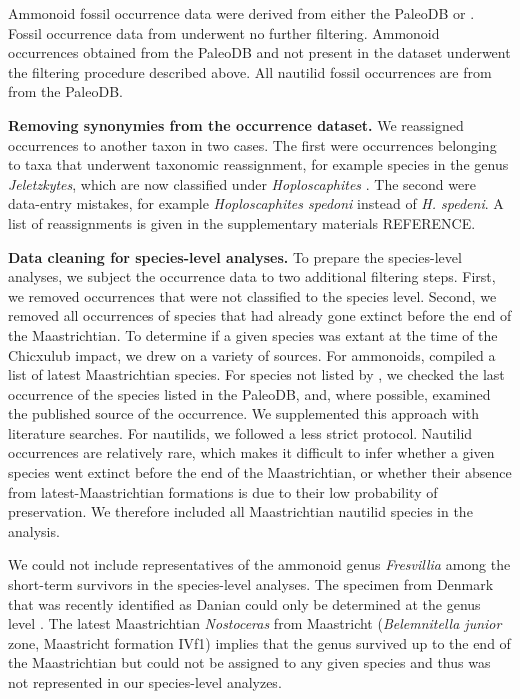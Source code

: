 \documentclass[a4paper]{article}
\begin{document}
Ammonoid fossil occurrence data were derived from either the PaleoDB or \textcite{flannery-sutherlandLateCretaceousAmmonoids2024}. Fossil occurrence data from \textcite{flannery-sutherlandLateCretaceousAmmonoids2024} underwent no further filtering. Ammonoid occurrences obtained from the PaleoDB and not present in the \textcite{flannery-sutherlandLateCretaceousAmmonoids2024} dataset underwent the filtering procedure described above. All nautilid fossil occurrences are from from the PaleoDB. 

\textbf{Removing synonymies from the occurrence dataset.} We reassigned occurrences to another taxon in two cases. The first were occurrences belonging to taxa that underwent taxonomic reassignment, for example species in the genus \textit{Jeletzkytes}, which are now classified under \textit{Hoploscaphites} \parencite{landmanScaphitesNodosusGroup2010}. The second were data-entry mistakes, for example \textit{Hoploscaphites spedoni} instead of \textit{H. spedeni}. A list of reassignments is given in the supplementary materials REFERENCE. 

\textbf{Data cleaning for species-level analyses.} To prepare the species-level analyses, we subject the occurrence data to two additional filtering steps. First, we removed occurrences that were not classified to the species level. Second, we removed all occurrences of species that had already gone extinct before the end of the Maastrichtian. To determine if a given species was extant at the time of the Chicxulub impact, we drew on a variety of sources. 
For ammonoids, \textcite{landmanAmmonitesBrinkExtinction2015} compiled a list of latest Maastrichtian species.
For species not listed by \textcite{landmanAmmonitesBrinkExtinction2015}, we checked the last occurrence of the species listed in the PaleoDB, and, where possible, examined the published source of the occurrence. We supplemented this approach with literature searches.
For nautilids, we followed a less strict protocol. Nautilid occurrences are relatively rare, which makes it difficult to infer whether a given species went extinct before the end of the Maastrichtian, or whether their absence from latest-Maastrichtian formations is due to their low probability of preservation. We therefore included all Maastrichtian nautilid species in the analysis. 


We could not include representatives of the ammonoid genus \textit{Fresvillia} among the short-term survivors in the species-level analyses. The specimen from Denmark that was recently identified as Danian could only be determined at the genus level \parencite{machalskiAmmoniteSurvivalCretaceous2025}.
The latest Maastrichtian \textit{Nostoceras} from Maastricht (\textit{Belemnitella junior} zone, Maastricht formation IVf1) implies that the genus survived up to the end of the Maastrichtian \parencite{vandertuukEersteVondstVan1979} but could not be assigned to any given species \parencite{vandertuukEersteVondstVan1979} and thus was not represented in our species-level analyzes. 
\end{document}

